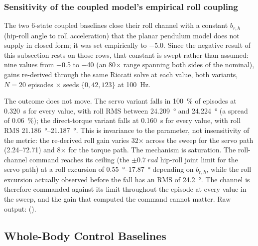 \documentclass[conference]{IEEEtran}
\begin{document}
\subsubsection{Sensitivity of the coupled model's empirical roll coupling}
\label{sec:b_roll_hip}

The two 6-state coupled baselines close their roll channel with a constant $b_{r,h}$ (hip-roll angle to roll acceleration) that the planar pendulum model does not supply in closed form; it was set empirically to $-5.0$. Since the negative result of this subsection rests on those rows, that constant is swept rather than assumed: nine values from \num{-0.5} to \num{-40} (an \num{80}$\times$ range spanning both sides of the nominal), gains re-derived through the same Riccati solve at each value, both variants, $N{=}20$ episodes $\times$ seeds $\{0,42,123\}$ at \SI{100}{Hz}.

The outcome does not move. The servo variant falls in \SI{100}{\percent} of episodes at \SI{0.320}{s} for every value, with roll RMS between \SI{24.209}{\degree} and \SI{24.224}{\degree} (a spread of \SI{0.06}{\percent}); the direct-torque variant falls at \SI{0.160}{s} for every value, with roll RMS \SIrange{21.186}{21.187}{\degree}. This is invariance to the parameter, not insensitivity of the metric: the re-derived roll gain varies \num{32}$\times$ across the sweep for the servo path (\SIrange{2.24}{72.71}{}) and \num{8}$\times$ for the torque path. The mechanism is saturation. The roll-channel command reaches its ceiling (the $\pm\SI{0.7}{rad}$ hip-roll joint limit for the servo path) at a roll excursion of \SIrange{0.55}{17.87}{\degree} depending on $b_{r,h}$, while the roll excursion actually observed before the fall has an RMS of \SI{24.2}{\degree}. The channel is therefore commanded against its limit throughout the episode at every value in the sweep, and the gain that computed the command cannot matter. Raw output:  ().


\subsection{Whole-Body Control Baselines}
\label{sec:wbc}
\end{document}
